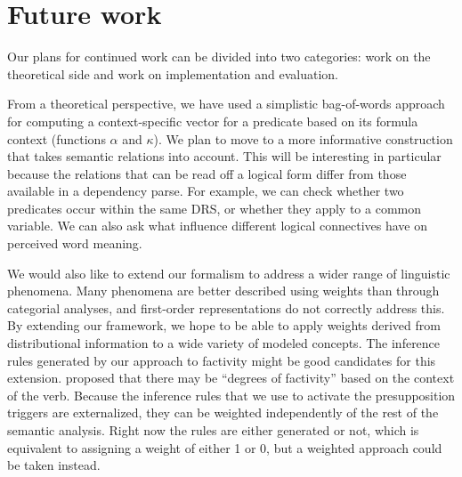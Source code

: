 \section{Future work}
\label{sec:future}

Our plans for continued work can be divided into two categories: work on the
theoretical side and work on implementation and evaluation.

From a theoretical perspective, we have used a simplistic bag-of-words
approach for
computing a context-specific vector for a predicate based on its
formula context (functions $\alpha$ and $\kappa$). We plan to move to a more informative construction
that takes semantic relations into account. This will be interesting in particular because the relations that can be read off a logical
form differ from those available in a dependency parse. For example,
we can check whether two predicates occur within the same DRS, or
whether they apply to a common variable. We can also ask what 
influence different logical connectives have on perceived word meaning. 


We would also like to extend our formalism to address a wider range of
linguistic phenomena.  Many phenomena are better described using weights than
through categorial analyses, and first-order representations do not correctly
address this.  By extending our framework, we hope to be able to apply weights
derived from distributional information to a wide variety of modeled concepts.
The inference rules generated by our approach to factivity might be good
candidates for this extension.  \citet{nairn:icos2006} proposed that there may  
be ``degrees of factivity'' based on the context of the verb.
Because the inference rules that we use to
activate the presupposition triggers are externalized, they can be weighted
independently of the rest of the semantic analysis.  Right now the rules are
either generated or not, which is equivalent to assigning a weight of either 1
or 0, but a weighted approach could be taken instead.

%

